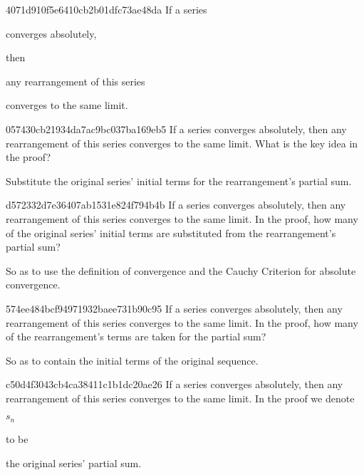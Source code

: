 \begin{note}{4071d910f5e6410cb2b01dfc73ae48da}
    If a series \begin{icloze}{2}converges absolutely,\end{icloze} then \begin{icloze}{3}any rearrangement of this series\end{icloze} \begin{icloze}{1}converges to the same limit.\end{icloze}
\end{note}

\begin{note}{057430cb21934da7ac9bc037ba169eb5}
    If a series converges absolutely, then any rearrangement of this series converges to the same limit.
    What is the key idea in the proof?

    \begin{cloze}{1}
        Substitute the original series' initial terms for the re\-ar\-range\-ment's partial sum.
    \end{cloze}
\end{note}

\begin{note}{d572332d7e36407ab1531e824f794b4b}
    If a series converges absolutely, then any rearrangement of this series converges to the same limit.
    In the proof, how many of the original series' initial terms are substituted from the rearrangement's partial sum?

    \begin{cloze}{1}
        So as to use the definition of convergence and the Cauchy Criterion for absolute convergence.
    \end{cloze}
\end{note}

\begin{note}{574ee484bcf94971932baee731b90c95}
    If a series converges absolutely, then any rearrangement of this series converges to the same limit.
    In the proof, how many of the rearrangement's terms are taken for the partial sum?

    \begin{cloze}{1}
        So as to contain the initial terms of the original sequence.
    \end{cloze}
\end{note}

\begin{note}{c50d4f3043cb4ca38411c1b1dc20ae26}
    If a series converges absolutely, then any rearrangement of this series converges to the same limit.
    In the proof we denote \begin{icloze}{2}\({ s_n }\)\end{icloze} to be \begin{icloze}{1}the original series' partial sum.\end{icloze}
\end{note}


